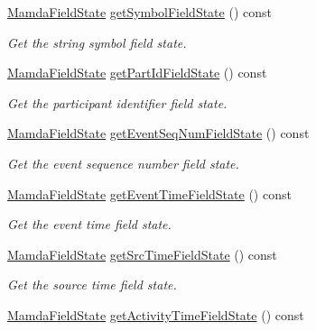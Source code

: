 \begin{CompactItemize}
\hyperlink{namespaceWombat_93aac974f2ab713554fd12a1fa3b7d2a}{Mamda\-Field\-State} \hyperlink{classWombat_1_1MamdaOptionChainListener_7329d289f1c07002d10f50a04a1ea8fc}{get\-Symbol\-Field\-State} () const 
\begin{CompactList}\small\item\em Get the string symbol field state. \item\end{CompactList}\item 
\hyperlink{namespaceWombat_93aac974f2ab713554fd12a1fa3b7d2a}{Mamda\-Field\-State} \hyperlink{classWombat_1_1MamdaOptionChainListener_8766c380f388bac26dc3ba51312b8e09}{get\-Part\-Id\-Field\-State} () const 
\begin{CompactList}\small\item\em Get the participant identifier field state. \item\end{CompactList}\item 
\hyperlink{namespaceWombat_93aac974f2ab713554fd12a1fa3b7d2a}{Mamda\-Field\-State} \hyperlink{classWombat_1_1MamdaOptionChainListener_b268208b087785469f9d86c71e01811b}{get\-Event\-Seq\-Num\-Field\-State} () const 
\begin{CompactList}\small\item\em Get the event sequence number field state. \item\end{CompactList}\item 
\hyperlink{namespaceWombat_93aac974f2ab713554fd12a1fa3b7d2a}{Mamda\-Field\-State} \hyperlink{classWombat_1_1MamdaOptionChainListener_8942c3987173fa87ec07f38cba68fc15}{get\-Event\-Time\-Field\-State} () const 
\begin{CompactList}\small\item\em Get the event time field state. \item\end{CompactList}\item 
\hyperlink{namespaceWombat_93aac974f2ab713554fd12a1fa3b7d2a}{Mamda\-Field\-State} \hyperlink{classWombat_1_1MamdaOptionChainListener_7f2c10954ad153ad4b6e051705fd60fe}{get\-Src\-Time\-Field\-State} () const 
\begin{CompactList}\small\item\em Get the source time field state. \item\end{CompactList}\item 
\hyperlink{namespaceWombat_93aac974f2ab713554fd12a1fa3b7d2a}{Mamda\-Field\-State} \hyperlink{classWombat_1_1MamdaOptionChainListener_2d0bea759653d2e73734d2fbfd01574a}{get\-Activity\-Time\-Field\-State} () const 

\end{CompactItemize}

